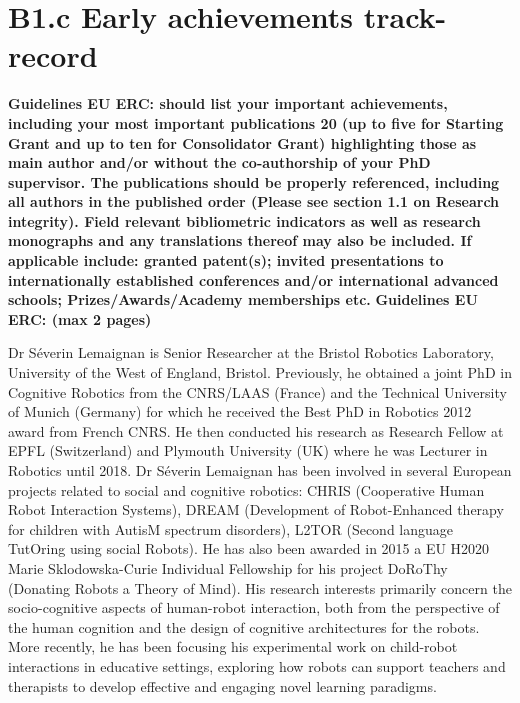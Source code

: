 \documentclass[11pt]{report}
\newcommand{\eu}[1]{{\color{teal}\textbf{Guidelines EU ERC: #1}}}
\begin{document}
\chapter{B1.c Early achievements track-record}\label{early-achievements-track-record}

\eu{should list your important achievements,
including your most important publications 20 (up to five for Starting Grant and up to ten for
Consolidator Grant) highlighting those as main author and/or without the co-authorship of your PhD
supervisor. The publications should be properly referenced, including all authors in the published
order (Please see section 1.1 on Research integrity). Field relevant bibliometric indicators as well as
research monographs and any translations thereof may also be included. If applicable include:
granted patent(s); invited presentations to internationally established conferences and/or
international advanced schools; Prizes/Awards/Academy memberships etc.}
\eu{(max 2 pages)}

Dr Séverin Lemaignan is Senior Researcher at the Bristol Robotics
Laboratory, University of the West of England, Bristol. Previously, he
obtained a joint PhD in Cognitive Robotics from the CNRS/LAAS (France)
and the Technical University of Munich (Germany) for which he received
the Best PhD in Robotics 2012 award from French CNRS. He then conducted
his research as Research Fellow at EPFL (Switzerland) and Plymouth
University (UK) where he was Lecturer in Robotics until 2018. Dr Séverin
Lemaignan has been involved in several European projects related to
social and cognitive robotics: CHRIS (Cooperative Human Robot
Interaction Systems), DREAM (Development of Robot-Enhanced therapy for
children with AutisM spectrum disorders), L2TOR (Second language
TutOring using social Robots). He has also been awarded in 2015 a EU
H2020 Marie Sklodowska-Curie Individual Fellowship for his project
DoRoThy (Donating Robots a Theory of Mind). His research interests
primarily concern the socio-cognitive aspects of human-robot
interaction, both from the perspective of the human cognition and the
design of cognitive architectures for the robots. More recently, he has
been focusing his experimental work on child-robot interactions in
educative settings, exploring how robots can support teachers and
therapists to develop effective and engaging novel learning paradigms.


\end{document}

